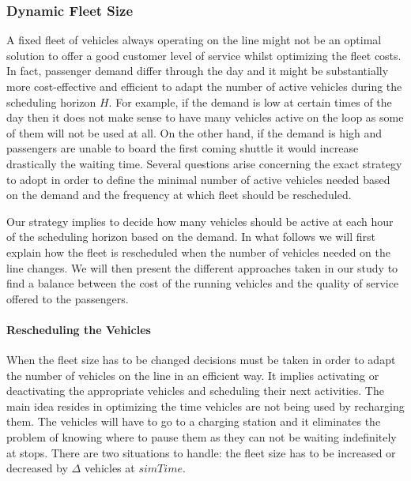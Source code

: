 \documentclass[12pt,a4paper]{article}
\begin{document}
\subsubsection{Dynamic Fleet Size}
A fixed fleet of vehicles always operating on the line might not be an optimal solution to offer a good customer level of service whilst optimizing the fleet costs. In fact, passenger demand differ through the day and it might be substantially more cost-effective and efficient to adapt the number of active vehicles during the scheduling horizon $H$. For example, if the demand is low at certain times of the day then it does not make sense to have many vehicles active on the loop as some of them will not be used at all. On the other hand, if the demand is high and passengers are unable to board the first coming shuttle it would increase drastically the waiting time. Several questions arise concerning the exact strategy to adopt in order to define the minimal number of active vehicles needed based on the demand and the frequency at which fleet should be rescheduled. 

Our strategy implies to decide how many vehicles should be active at each hour of the scheduling horizon based on the demand. In what follows we will first explain how the fleet is rescheduled when the number of vehicles needed on the line changes. We will then present the different approaches taken in our study to find a balance between the cost of the running vehicles and the quality of service offered to the passengers. 

\paragraph{Rescheduling the Vehicles} When the fleet size has to be changed decisions must be taken in order to adapt the number of vehicles on the line in an efficient way. It implies activating or deactivating the appropriate vehicles and scheduling their next activities. The main idea resides in optimizing the time vehicles are not being used by recharging them. The vehicles will have to go to a charging station and it eliminates the problem of knowing where to pause them as they can not be waiting indefinitely at stops. There are two situations to handle: the fleet size has to be increased or decreased by $\Delta$ vehicles at $simTime$. 
\end{document}
